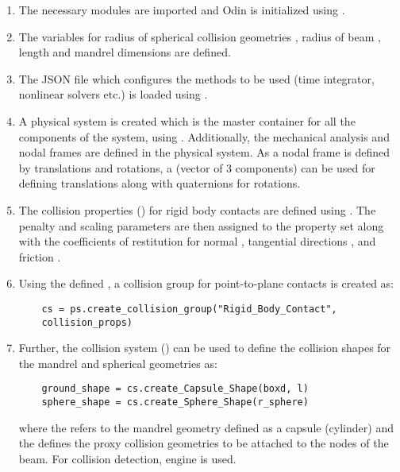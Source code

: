 \begin{enumerate}
    \item The necessary modules are imported and Odin is initialized using .
    \item The variables for radius of spherical collision geometries , radius of beam , length  and mandrel dimensions are defined.
    \item The JSON file which configures the methods to be used (time integrator, nonlinear solvers etc.) is loaded using .
    \item A physical system is created which is the master container for all the components of the system, using . Additionally, the mechanical analysis and nodal frames are defined in the physical system. As a nodal frame is defined by translations and rotations, a  (vector of 3 components) can be used for defining translations along with quaternions for rotations.
    \item The collision properties () for rigid body contacts are defined using . The penalty and scaling parameters are then assigned to the property set along with the coefficients of restitution for normal , tangential directions , and friction .
    \item Using the defined  , a collision group for point-to-plane contacts is created as:
    \pythonstyle
    \begin{tcolorbox}\begin{lstlisting}
    cs = ps.create_collision_group("Rigid_Body_Contact", 
    collision_props)
    \end{lstlisting}\end{tcolorbox}
    \item Further, the collision system () can be used to define the collision shapes for the mandrel and spherical geometries as:
    \pythonstyle
    \begin{tcolorbox}\begin{lstlisting}
    ground_shape = cs.create_Capsule_Shape(boxd, l)
    sphere_shape = cs.create_Sphere_Shape(r_sphere)
    \end{lstlisting}\end{tcolorbox}
    where the  refers to the mandrel geometry defined as a capsule (cylinder) and the  defines the proxy collision geometries to be attached to the nodes of the beam. For collision detection,  engine is used.

\end{enumerate}
